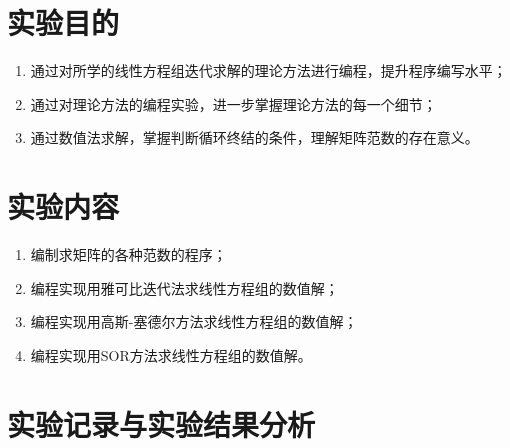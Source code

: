 






\newcommand{\ThisProjectTitle}{解线性方程组的迭代法}
\newcommand{\ThisDate}{2017年11月28日}
\newcommand{\ThisNo}{No.2}






\section{实验目的}
\begin{enumerate}[leftmargin=1.4cm, itemsep=-0.5mm]
    \item 通过对所学的线性方程组迭代求解的理论方法进行编程，提升程序编写水平；
    \item 通过对理论方法的编程实验，进一步掌握理论方法的每一个细节；
    \item 通过数值法求解，掌握判断循环终结的条件，理解矩阵范数的存在意义。
    
\end{enumerate}

\section{实验内容}
\begin{enumerate}[leftmargin=1.4cm, itemsep=-0.5mm]
    \item 编制求矩阵的各种范数的程序；
    \item 编程实现用雅可比迭代法求线性方程组的数值解；
    \item 编程实现用高斯-塞德尔方法求线性方程组的数值解；
    \item 编程实现用SOR方法求线性方程组的数值解。
\end{enumerate}



\section{实验记录与实验结果分析}

